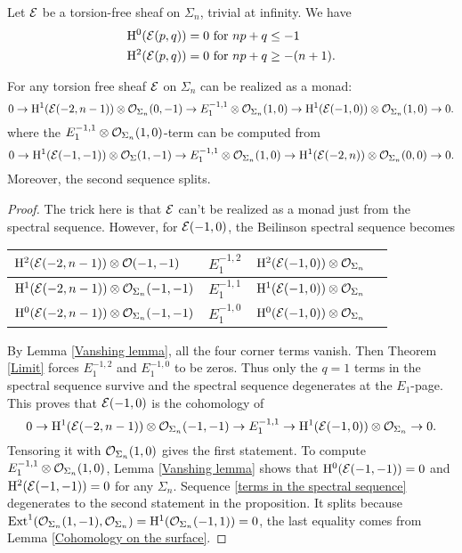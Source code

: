 \documentclass[../main.tex]{subfiles}
\begin{document}
\begin{lemma}\label{Vanshing lemma}
Let $\mathcal{E}$ be a torsion-free sheaf on $\Sigma_{n}$, trivial at infinity. We have
\begin{align*}
\mathrm{H}^{0}(\mathcal{E}(p,q))=0 & \text{ for } np+q\leq -1\\
\mathrm{H}^{2}(\mathcal{E}(p,q))=0 & \text{ for } np+q\geq -(n+1).
\end{align*}
\end{lemma}


\begin{proposition}
For any torsion free sheaf $\mathcal{E}$ on $\Sigma_{n}$ can be realized as a monad:
$$0\rightarrow \mathrm{H}^{1}(\mathcal{E}(-2,n-1))\otimes \mathcal{O}_{\Sigma_{n}}(0, -1)\rightarrow E_{1}^{-1, 1}\otimes\mathcal{O}_{\Sigma_{n}}(1, 0)\rightarrow  \mathrm{H}^{1}(\mathcal{E}(-1, 0))\otimes \mathcal{O}_{\Sigma_{n}}(1, 0)\rightarrow 0.$$
where the $E_{1}^{-1, 1}\otimes \mathcal{O}_{\Sigma_{n}}(1, 0)$-term can be computed from 
$$0 \rightarrow \mathrm{H}^{1}(\mathcal{E}(-1, -1))\otimes\mathcal{O}_{\Sigma}(1, -1)\rightarrow E_{1}^{-1, 1}\otimes \mathcal{O}_{\Sigma_{n}}(1, 0)\rightarrow \mathrm{H}^{1}(\mathcal{E}(-2, n))\otimes \mathcal{O}_{\Sigma_{n}}(0, 0)\rightarrow 0.$$
Moreover, the second sequence splits.
\end{proposition}
\begin{proof}
The trick here is that $\mathcal{E}$ can't be realized as a monad just from the spectral sequence. However, for $\mathcal{E}(-1, 0)$, the Beilinson spectral sequence becomes
\begin{center}
\begin{tabular}{|p{5.5cm}|p{1cm}|p{3.5cm}|p{0.5cm}| }
 \hline
 $\mathrm{H}^{2}(\mathcal{E}(-2,n-1))\otimes\mathcal{O}(-1, -1)$&$E_{1}^{-1,2}$& $\mathrm{H}^2(\mathcal{E}(-1, 0))\otimes \mathcal{O}_{\Sigma_{n}}$\\
 \hline
$\mathrm{H}^{1}(\mathcal{E}(-2,n-1))\otimes \mathcal{O}_{\Sigma_{n}}(-1,-1)$&$E_{1}^{-1,1}$&$\mathrm{H}^{1}(\mathcal{E}(-1, 0))\otimes \mathcal{O}_{\Sigma_{n}}$\\
 \hline
 $\mathrm{H}^{0}(\mathcal{E}(-2,n-1))\otimes \mathcal{O}_{\Sigma_{n}}(-1,-1)$&$E_{1}^{-1,0}$& $\mathrm{H}^{0}(\mathcal{E}(-1, 0))\otimes \mathcal{O}_{\Sigma_{n}}$\\
 \hline
\end{tabular}
\end{center}
By Lemma \ref{Vanshing lemma}, all the four corner terms vanish. Then Theorem \ref{Limit} forces $E_{1}^{-1,2}$ and $E_{1}^{-1, 0}$ to be zeros. Thus only the $q=1$ terms in the spectral sequence survive and the spectral sequence degenerates at the $E_{1}$-page. This proves that $\mathcal{E}(-1, 0)$ is the cohomology of 
$$0\rightarrow \mathrm{H}^{1}(\mathcal{E}(-2,n-1))\otimes \mathcal{O}_{\Sigma_{n}}(-1, -1)\rightarrow E_{1}^{-1, 1}\rightarrow  \mathrm{H}^{1}(\mathcal{E}(-1, 0))\otimes \mathcal{O}_{\Sigma_{n}}\rightarrow 0.$$
Tensoring it with $\mathcal{O}_{\Sigma_{n}}(1, 0)$ gives the first statement. To compute $E_{1}^{-1,1}\otimes\mathcal{O}_{\Sigma_{n}}(1, 0)$, Lemma \ref{Vanshing lemma} shows that $\mathrm{H}^{0}(\mathcal{E}(-1, -1))=0$ and $\mathrm{H}^{2}(\mathcal{E}(-1,-1))=0$ for any $\Sigma_{n}$. Sequence \ref{terms in the spectral sequence} degenerates to the second statement in the proposition. It splits because  $\operatorname{Ext}^{1}(\mathcal{O}_{\Sigma_{n}}(1, -1), \mathcal{O}_{\Sigma_{n}}) =\mathrm{H}^1(\mathcal{O}_{\Sigma_{n}}(-1, 1))=0$, the last equality comes from Lemma \ref{Cohomology on the surface}.
\end{proof}
\end{document}
